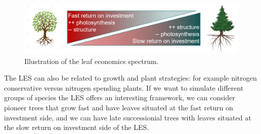 \documentclass[12pt,oneside]{book}
\begin{document}
\begin{figure}

{\centering \includegraphics[width=0.8\linewidth]{figures/chap7/f74_LES} 

}

\caption{Illustration of the leaf economics spectrum.}\label{fig:f74}
\end{figure}

The LES can also be related to growth and plant strategies: for example
nitrogen conservative versus nitrogen spending plants. If we want to
simulate different groups of species the LES offers an interesting
framework, we can consider pioneer trees that grow fast and have leaves
situated at the fast return on investment side, and we can have late
successionial trees with leaves situated at the slow return on
investment side of the LES.
\end{document}
